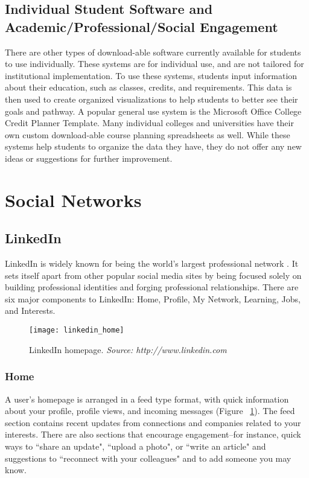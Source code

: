 \subsection{Individual Student Software and Academic/Professional/Social Engagement}

There are other types of download-able software currently available for students to use individually. These systems are for individual use, and are not tailored for institutional implementation. To use these systems, students input information about their education, such as classes, credits, and requirements. This data is then used to create organized visualizations to help students to better see their goals and pathway. A popular general use system is the Microsoft Office College Credit Planner Template. Many individual colleges and universities have their own custom download-able course planning spreadsheets as well. While these systems help students to organize the data they have, they do not offer any new ideas or suggestions for further improvement.

\section{Social Networks}
\subsection{LinkedIn}

LinkedIn is widely known for being the world's largest professional network \cite{LinkedIn}. It sets itself apart from other popular social media sites by being focused solely on building professional identities and forging professional relationships. There are six major components to LinkedIn: Home, Profile, My Network, Learning, Jobs, and Interests.

\begin{figure}[h]
\centering
\texttt{[image: linkedin\_home]}
\caption{LinkedIn homepage. \textit{Source: http://www.linkedin.com}}
\label{linkedin-home}
\end{figure}

\subsubsection{Home}

A user's homepage is arranged in a feed type format, with quick information about your profile, profile views, and incoming messages (Figure ~\ref{linkedin-home}). The feed section contains recent updates from connections and companies related to your interests. There are also sections that encourage engagement--for instance, quick ways to ``share an update", ``upload a photo", or ``write an article" and suggestions to ``reconnect with your colleagues" and to add someone you may know. 

